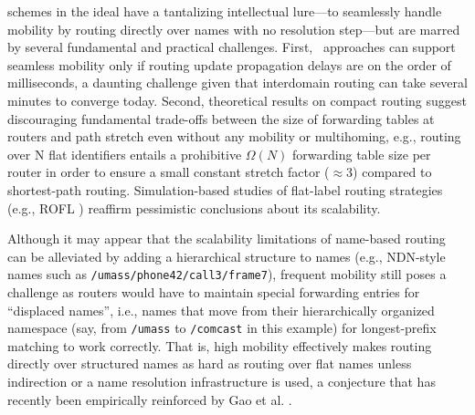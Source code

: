 {\textbf \Namerouting} schemes in the ideal have a tantalizing intellectual lure---to seamlessly handle mobility by routing directly over names  with no resolution step---but are marred by several fundamental and practical challenges. First, \namerouting\ approaches can support seamless mobility only if routing update propagation delays are on the order of milliseconds, a daunting challenge given that interdomain routing can take several minutes to converge today. Second, theoretical results on compact routing \cite{compact-routing} suggest discouraging fundamental trade-offs between the size of forwarding tables at routers and path stretch even without any mobility or multihoming, e.g.,  routing over N flat identifiers entails a prohibitive $\Omega(N)$ forwarding table size per router in order to ensure a small constant stretch factor ($\approx$3) compared to shortest-path routing. Simulation-based studies of flat-label routing strategies (e.g., ROFL \cite{ROFL}) reaffirm pessimistic conclusions about its scalability. 

Although it may appear that the scalability limitations of name-based routing can be alleviated by adding a hierarchical structure to names \cite{TRIAD, DONA, CCN} (e.g., NDN-style \cite{CCN} names such as  \verb+/umass/phone42/call3/frame7+), frequent mobility still poses a challenge as routers would have to maintain special forwarding entries for ``displaced names'', i.e., names that move from their hierarchically organized namespace (say, from \verb+/umass+ to \verb+/comcast+ in this example) for longest-prefix matching to work correctly. That is, high mobility effectively makes routing directly over structured names as hard as routing over flat names unless indirection or a name resolution infrastructure is used, a conjecture that has recently been empirically reinforced by Gao et al. \cite{Gao14LocInd}.


